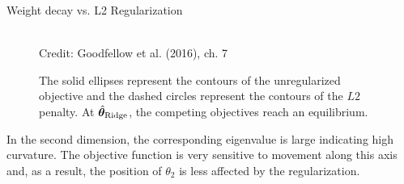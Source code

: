 \begin{vbframe}{Weight decay vs. L2 Regularization}
    \begin{figure}
    \centering
      \tiny{\\ Credit: Goodfellow et al. (2016), ch. 7}
      \caption{\footnotesize The solid ellipses represent the contours of the unregularized objective and the dashed circles represent the contours of the $L2$ penalty. At $\hat{\bm{\theta}}_{\text{Ridge}}$, the competing objectives reach an equilibrium.}
  \end{figure}

    In the second dimension, the corresponding eigenvalue is large indicating high curvature. The objective function is very sensitive to movement along this axis and, as a result, the position of $\theta_2$ is less affected by the regularization.

\end{vbframe}

\endlecture

